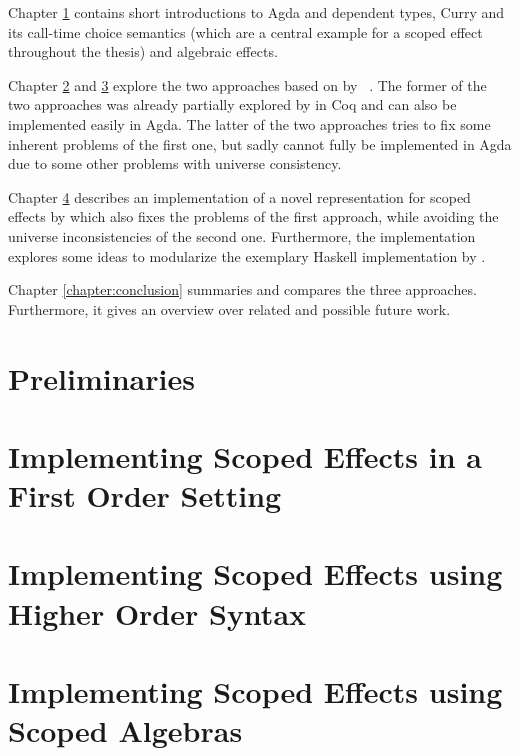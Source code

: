 \documentclass[10pt,a4paper,twoside,notitlepage]{report}
\begin{document}
Chapter \ref{chapter:preliminaries} contains short introductions to Agda and
dependent types, Curry and its call-time choice semantics (which are a central
example for a scoped effect throughout the thesis) and algebraic effects.

Chapter \ref{chapter:first-order} and \ref{chapter:higher-order} explore the two
approaches based on  by
~\textcite{DBLP:conf/haskell/WuSH14}.
The former of the two approaches was already partially explored by
\textcite{bunkenburg2019modeling} in Coq and can also be implemented
easily in Agda.
The latter of the two approaches tries to fix some inherent problems of the
first one, but sadly cannot fully be implemented in Agda due to some other
problems with universe consistency.

Chapter \ref{chapter:scoped-algebras} describes an implementation of a novel
representation for scoped effects by \textcite{DBLP:conf/lics/PirogSWJ18} which
also fixes the problems of the first approach, while avoiding the universe
inconsistencies of the second one.
Furthermore, the implementation explores some ideas to modularize the exemplary
Haskell implementation by \citeauthor{DBLP:conf/lics/PirogSWJ18}.

Chapter \ref{chapter:conclusion} summaries and compares the three approaches.
Furthermore, it gives an overview over related and possible future work.

\chapter{Preliminaries}
\label{chapter:preliminaries}


\chapter{Implementing Scoped Effects in a First Order Setting}
\label{chapter:first-order}


\chapter{Implementing Scoped Effects using Higher Order Syntax}
\label{chapter:higher-order}


\chapter{Implementing Scoped Effects using Scoped Algebras}
\label{chapter:scoped-algebras}

\end{document}
